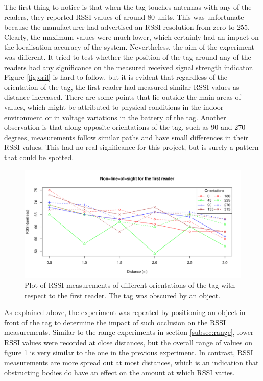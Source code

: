 The first thing to notice is that when the tag touches antennas with any of the readers, they reported RSSI values of around 80 units. This was unfortunate because the manufacturer had advertised an RSSI resolution from zero to 255. Clearly, the maximum values were much lower, which certainly had an impact on the localisation accuracy of the system. Nevertheless, the aim of the experiment was different. It tried to test whether the position of the tag around any of the readers had any significance on the measured received signal strength indicator. Figure \ref{fig:oril} is hard to follow, but it is evident that regardless of the orientation of the tag, the first reader had measured similar RSSI values as distance increased. There are some points that lie outside the main areas of values, which might be attributed to physical conditions in the indoor environment or in voltage variations in the battery of the tag. Another observation is that along opposite orientations of the tag, such as 90 and 270 degrees, measurements follow similar paths and have small differences in their RSSI values. This had no real significance for this project, but is surely a pattern that could be spotted. 
\begin{figure}[h]
	\begin{center}
		\includegraphics[width=1\textwidth]{figures/rssi_distance_3m_nlos_r1}
		\caption{Plot of RSSI measurements of different orientations of the tag with respect to the first reader. The tag was obscured by an object.}
		\label{fig:orin}
	\end{center}
\end{figure}

As explained above, the experiment was repeated by positioning an object in front of the tag to determine the impact of such occlusion on the RSSI measurements. Similar to the range experiments in section \ref{subsec:range}, lower RSSI values were recorded at close distances, but the overall range of values on figure \ref{fig:orin} is very similar to the one in the previous experiment. In contrast, RSSI measurements are more spread out at most distances, which is an indication that obstructing bodies do have an effect on the amount at which RSSI varies.


